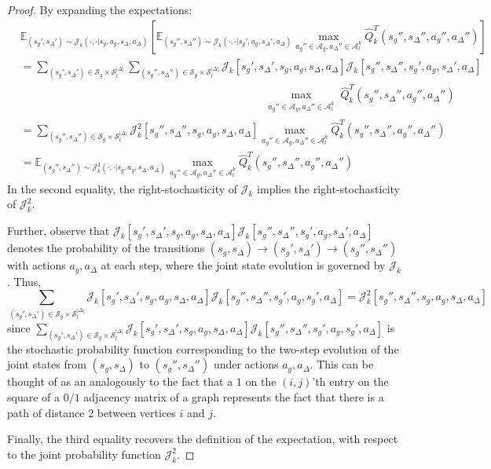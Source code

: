 \documentclass{article}
\theoremstyle{plain}
\theoremstyle{definition}
\def\E{\mathbb{E}}
\begin{document}
\begin{proof}
By expanding the expectations:
\begin{align*}
&\E_{(s_g',s_\Delta')\sim \mathcal{J}_k(\cdot,\cdot|s_g,a_g,s_\Delta,a_\Delta)}\left[\E_{(s_g'',s_\Delta'')\sim \mathcal{J}_k(\cdot,\cdot|s_g',a_g,s_\Delta',a_\Delta)}\max_{a_g''\in\mathcal{A}_g,a_\Delta''\in\mathcal{A}_l^k}\hat{Q}_k^T(s_g'',s_\Delta'',a_g'',a_\Delta'')\right] \\
&= \sum_{(s_g',s_\Delta')\in\mathcal{S}_g\times\mathcal{S}_l^{|\Delta|}}\sum_{(s_g'',s_\Delta'')\in\mathcal{S}_g\times\mathcal{S}_l^{|\Delta|}}\mathcal{J}_k[s_g',s_\Delta', s_g,a_g,s_\Delta,a_\Delta]\mathcal{J}_k[s_g'',s_\Delta'', s_g',a_g,s_\Delta',a_\Delta]\\ 
&\quad\quad\quad\quad\quad\quad\quad\quad\quad\quad\quad\quad\quad\quad\quad\quad\quad\quad\quad\quad\quad \quad \max_{\substack{a_g''\in\mathcal{A}_g, a_\Delta''\in\mathcal{A}_l^k}}\hat{Q}_k^T(s_g'',s_\Delta'',a_g'',a_\Delta'') \\
&= \sum_{(s_g'',s_\Delta'')\in\mathcal{S}_g\times\mathcal{S}_l^{|\Delta|}}\mathcal{J}_k^2[s_g'',s_\Delta'', s_g, a_g, s_\Delta,a_\Delta] \max_{a_g''\in\mathcal{A}_g,a_\Delta''\in\mathcal{A}_l^k}\hat{Q}^T_k(s_g'',s_\Delta'',a_g'',a_\Delta'') \\
&= \E_{(s_g'',s_\Delta'')\sim\mathcal{J}_k^2(\cdot,\cdot|s_g,a_g,s_\Delta,a_\Delta)}\max_{a_g''\in\mathcal{A}_g,a_\Delta''\in\mathcal{A}_l^k}\hat{Q}_k^T(s_g'',s_\Delta'',a_g'',a_\Delta'')
\end{align*}
In the second equality, the right-stochasticity of $\mathcal{J}_k$ implies the right-stochasticity of $\mathcal{J}_k^2$. 


Further, observe that $\mathcal{J}_k[s_g',s_\Delta',s_g,a_g,s_\Delta,a_\Delta]\mathcal{J}_k[s_g'',s_\Delta'',s_g',a_g,s_\Delta',a_\Delta]$ denotes the probability of the transitions $(s_g,s_\Delta)\to (s_g',s_\Delta')\to (s_g'',s_\Delta'')$ with actions $a_g,a_\Delta$ at each step, where the joint state evolution is governed by $\mathcal{J}_k$. Thus, \[\sum_{(s_g',s_\Delta')\in\mathcal{S}_g\times\mathcal{S}_l^{|\Delta|}}\mathcal{J}_k[s_g',s_\Delta',s_g,a_g,s_\Delta,a_\Delta]\mathcal{J}_k[s_g'',s_\Delta'',s_g', a_g, s_g',a_\Delta] = \mathcal{J}_k^2[s_g'',s_\Delta'',s_g,a_g,s_\Delta,a_\Delta]\] since $\sum_{(s_g',s_\Delta')\in\mathcal{S}_g\times\mathcal{S}_l^{|\Delta|}}\mathcal{J}_k[s_g',s_\Delta',s_g,a_g,s_\Delta,a_\Delta]\mathcal{J}_k[s_g'',s_\Delta'',s_g', a_g, s_g',a_\Delta]$ is the stochastic probability function corresponding to the two-step evolution of the joint states from $(s_g,s_\Delta)$ to $(s_g'',s_\Delta'')$ under actions $a_g,a_\Delta$. This can be thought of as an analogously to the fact that a $1$ on the $(i,j)$'th entry on the square of a $0/1$ adjacency matrix of a graph represents the fact that there is a path of distance $2$ between vertices $i$ and $j$.

Finally, the third equality recovers the definition of the expectation, with respect to the joint probability function  $\mathcal{J}_k^2$. \qedhere 
\end{proof}
\end{document}
